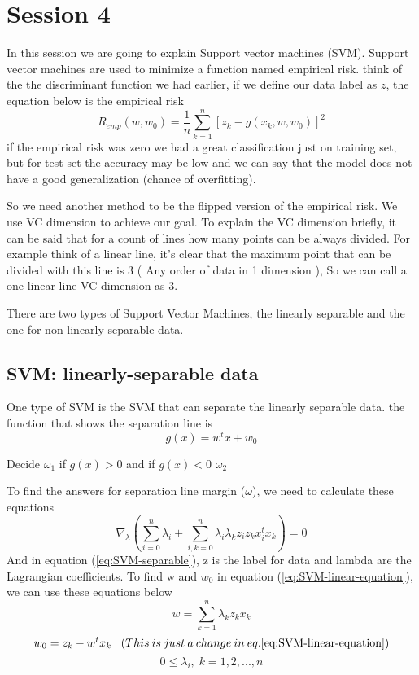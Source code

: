 \documentclass{article}
\begin{document}
\section{Session 4}
In this session we are going to explain Support vector machines (SVM). Support vector machines are used to minimize a function named empirical risk. think of the the discriminant function we had earlier, if we define our data label as $z$, the equation below is the empirical risk
\begin{equation}
    R_{emp}(w, w_0) = \frac{1}{n} \sum_{k=1}^{n} [z_k - g(x_k, w, w_0)]^2
\end{equation}
if the empirical risk was zero we had a great classification just on training set, but for test set the accuracy may be low and we can say that the model does not have a good generalization (chance of overfitting). \par
So we need another method to be the flipped version of the empirical risk. We use VC dimension to achieve our goal. To explain the VC dimension briefly, it can be said that for a count of lines how many points can be always divided. For example think of a linear line, it's clear that the maximum point that can be divided with this line is 3 ( Any order of data in 1 dimension ), So we can call a one linear line VC dimension as 3.

There are two types of Support Vector Machines, the linearly separable and the one for non-linearly separable data.
\subsection{SVM: linearly-separable data}
One type of SVM is the SVM that can separate the linearly separable data. the function that shows the separation line is 
\begin{equation} \label{eq:SVM-linear-equation}
    g(x) = w^t x + w_0
\end{equation}
\begin{center}
    \footnotesize{Decide $\omega_1$ if $g(x) > 0$ and if $g(x) < 0$ $\omega_2$}
\end{center}
To find the answers for separation line margin ($\omega$), we need to calculate these equations 
\begin{equation} \label{eq:SVM-separable}
    \nabla_{\lambda} (\sum_{i=0}^{n} \lambda_i + \sum_{i,k = 0}^{n} \lambda_i \lambda_k z_i z_k x_i^t x_k) = 0
\end{equation}
And in equation (\ref{eq:SVM-separable}), z is the label for data and lambda are the Lagrangian coefficients. To find w and $w_0$ in equation (\ref{eq:SVM-linear-equation}), we can use these equations below
\begin{equation}
    w = \sum_{k=1}^{n} \lambda_k z_k x_k
\end{equation}
\begin{equation}
    w_0 = z_k - w^t x_k \; \; \; (This\:is \: just \: a \: change \: in \: eq.\ref{eq:SVM-linear-equation})
\end{equation}
\begin{equation}
    0 \leq \lambda_i, \; k = 1,2,...,n    
\end{equation}
\end{document}
